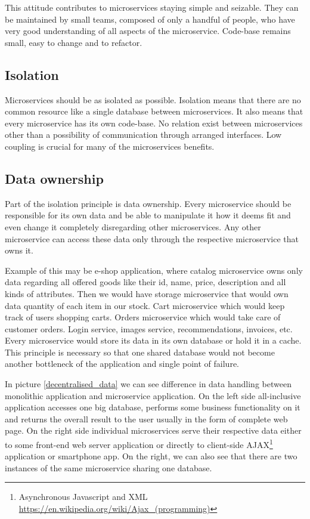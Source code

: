 \documentclass[12pt,oneside]{fithesis2}
\begin{document}
This attitude contributes to microservices staying simple and seizable. They can be maintained by small teams, composed of only a handful of people, who have very good understanding of all aspects of the microservice. Code-base remains small, easy to change and to refactor.

\subsection{Isolation}

Microservices should be as isolated as possible. Isolation means that there are no common resource like a single database between microservices. It also means that every microservice has its own code-base. No relation exist between microservices other than a possibility of communication through arranged interfaces. Low coupling is crucial for many of the microservices benefits.

\subsection{Data ownership}

Part of the isolation principle is data ownership. Every microservice should be responsible for its own data and be able to manipulate it how it deems fit and even change it completely disregarding other microservices. Any other microservice can access these data only through the respective microservice that owns it.

Example of this may be e-shop application, where catalog microservice owns only data regarding all offered goods like their id, name, price, description and all kinds of attributes. Then we would have storage microservice that would own data quantity of each item in our stock. Cart microservice which would keep track of users shopping carts. Orders microservice which would take care of customer orders. Login service, images service, recommendations, invoices, etc.
Every microservice would store its data in its own database or hold it in a cache. This principle is necessary so that one shared database would not become another bottleneck of the application and single point of failure.

In picture \ref{decentralised_data} we can see difference in data handling between monolithic application and microservice application. On the left side all-inclusive application accesses one big database, performs some business functionality on it and returns the overall result to the user usually in the form of complete web page. On the right side individual microservices serve their respective data either to some front-end web server application or directly to client-side AJAX\footnote{Asynchronous Javascript and XML \url{https://en.wikipedia.org/wiki/Ajax_(programming)}} application or smartphone app. On the right, we can also see that there are two instances of the same microservice sharing one database.
\end{document}
